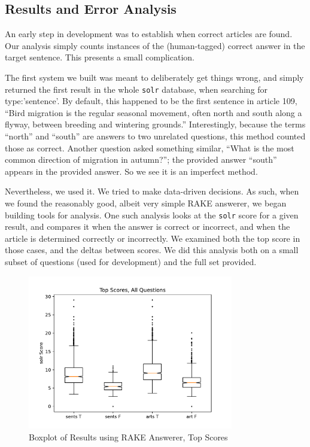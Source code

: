 \documentclass[11pt]{article}
\begin{document}
\subsection{Results and Error Analysis}

An early step in development was to establish when correct articles are found. Our analysis simply counts instances of the (human-tagged) correct answer in the target sentence. This presents a small complication.

The first system we built was meant to deliberately get things wrong, and simply returned the first result in the whole \texttt{solr} database, when searching for type:'sentence'. By default, this happened to be the first sentence in article 109, ``Bird migration is the regular seasonal movement, often north and south along a flyway, between breeding and wintering grounds.'' Interestingly, because the terms ``north'' and ``south'' are answers to two unrelated questions, this method counted those as correct. Another question asked something similar, ``What is the most common direction of migration in autumn?''; the provided answer ``south'' appears in the provided answer. So we see it is an imperfect method.

Nevertheless, we used it. We tried to make data-driven decisions. As such, when we found the reasonably good, albeit very simple RAKE answerer, we began building tools for analysis. One such analysis looks at the \texttt{solr} score for a given result, and compares it when the answer is correct or incorrect, and when the article is determined correctly or incorrectly. We examined both the top score in those cases, and the deltas between scores. We did this analysis both on a small subset of questions (used for development) and the full set provided.

  \begin{figure}[H]
    \centering
    \includegraphics[width=0.8\textwidth]{fig/bt-all.pdf}
    \caption{Boxplot of Results using RAKE Answerer, Top Scores}
    \label{fig:bt-rake}
  \end{figure}
\end{document}
